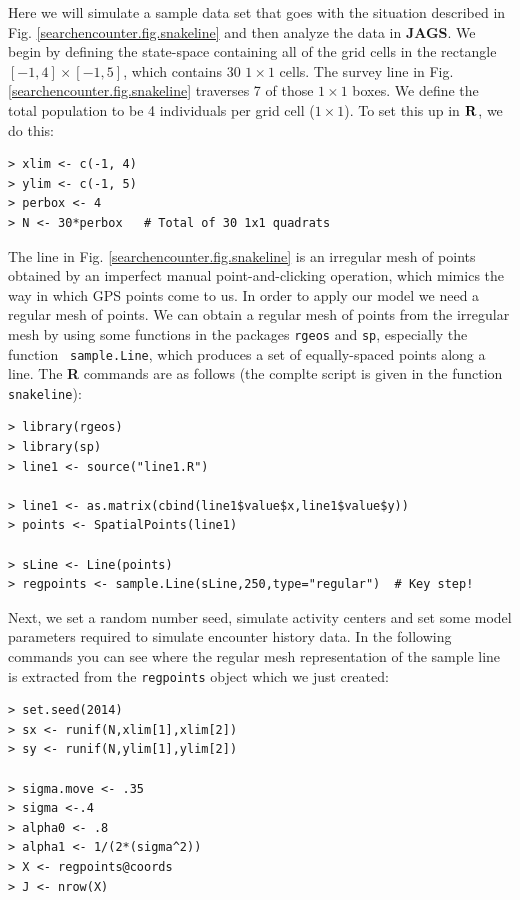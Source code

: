 Here we will simulate a sample data set that goes with the situation
described in Fig. \ref{searchencounter.fig.snakeline} and then
analyze the data in {\bf JAGS}.  We begin by defining the state-space
containing all of the grid cells in the rectangle $[-1,4] \times
[-1,5]$, which contains 30 $1 \times 1$ cells. The survey line in
Fig. \ref{searchencounter.fig.snakeline} traverses 7 of those $1
\times 1$ boxes.  We define the total population to be
 4 individuals per grid cell ($1 \times 1$). To set this up in ${\bf
   R}$, we do this:
\begin{verbatim}
> xlim <- c(-1, 4)
> ylim <- c(-1, 5)
> perbox <- 4
> N <- 30*perbox   # Total of 30 1x1 quadrats
\end{verbatim}
The line in Fig. \ref{searchencounter.fig.snakeline} is an irregular
mesh of points obtained by an imperfect manual point-and-clicking
operation, which mimics the
way in which GPS points come to us. In order to apply our model we
need a regular mesh of points. We can obtain a regular mesh of points
from the irregular mesh by using some functions in the packages
\mbox{\tt rgeos} and \mbox{\tt sp}, especially the function \mbox{\tt
  sample.Line}, which produces a set of equally-spaced points along a
line. The {\bf R} commands are as follows
(the complte script is
given in the function \mbox{\tt snakeline}):
\begin{verbatim}
> library(rgeos)
> library(sp)
> line1 <- source("line1.R")

> line1 <- as.matrix(cbind(line1$value$x,line1$value$y))
> points <- SpatialPoints(line1)

> sLine <- Line(points)
> regpoints <- sample.Line(sLine,250,type="regular")  # Key step!
\end{verbatim}
Next, we set a random number seed, simulate activity centers and set
some model parameters required to simulate encounter history data.
In the following commands you can see where the
regular mesh representation of the sample line is extracted from the
\mbox{\tt regpoints} object which we just created:
\begin{verbatim}
> set.seed(2014)
> sx <- runif(N,xlim[1],xlim[2])
> sy <- runif(N,ylim[1],ylim[2])

> sigma.move <- .35
> sigma <-.4
> alpha0 <- .8
> alpha1 <- 1/(2*(sigma^2))
> X <- regpoints@coords
> J <- nrow(X)
\end{verbatim}

